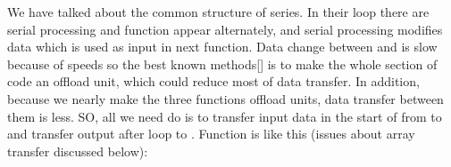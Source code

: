 \documentclass{article}
\begin{document}
\noindent{}We have talked about the common structure of  series. In their  loop there are serial processing and  function appear alternately, and serial processing modifies data which is used as input in next function. Data change between  and  is slow because of  speeds so the best known methods[] is to make the whole section of code an offload unit, which could reduce most of data transfer. In addition, because we nearly make the three  functions offload units, data transfer between them is less. SO, all we need do is to transfer input data in the start of  from  to  and transfer output after loop to .  Function is like this (issues about array transfer discussed below):%
\end{document}
